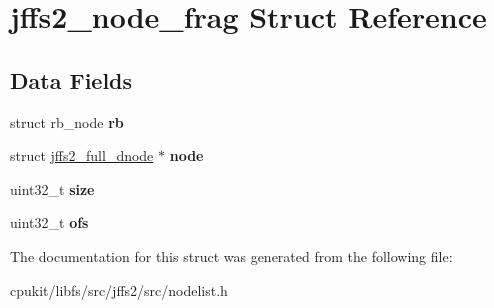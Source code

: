 \hypertarget{structjffs2__node__frag}{}\section{jffs2\+\_\+node\+\_\+frag Struct Reference}
\label{structjffs2__node__frag}
\subsection*{Data Fields}
\begin{DoxyCompactItemize}
\item 
\mbox{\label{structjffs2__node__frag_a2125baca8fb763157f281705c5ffd0d2}} 
struct rb\+\_\+node {\bfseries rb}
\item 
\mbox{\label{structjffs2__node__frag_af9f3b10e7cde6aca5ca1fd3634329025}} 
struct \mbox{\hyperlink{structjffs2__full__dnode}{jffs2\+\_\+full\+\_\+dnode}} $\ast$ {\bfseries node}
\item 
\mbox{\label{structjffs2__node__frag_a13c328151faf5df2fad69f7343bdd94b}} 
uint32\+\_\+t {\bfseries size}
\item 
\mbox{\label{structjffs2__node__frag_af480a5b3df3dc9ab7a492fbec7b569b9}} 
uint32\+\_\+t {\bfseries ofs}
\end{DoxyCompactItemize}


The documentation for this struct was generated from the following file\+:\begin{DoxyCompactItemize}
\item 
cpukit/libfs/src/jffs2/src/nodelist.\+h\end{DoxyCompactItemize}
